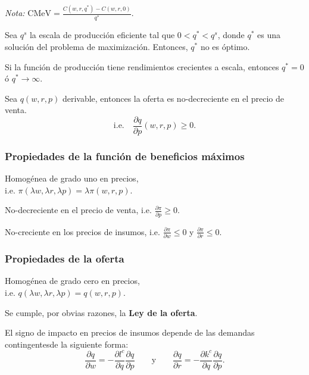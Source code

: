 \documentclass[8pt,a4paper]{extarticle}
\begin{document}
\begin{multicols}{3}
\textit{Nota:} $\displaystyle \text{CMeV} = \frac{C(w, r, q^*) - C(w, r, 0)}{q^*}$.

\sectionbreak

\begin{boxprop}
	Sea $q^s$ la escala de producción eficiente tal que $0 < q^* < q^s$, donde $q^*$ es una solución del problema de maximización. Entonces, $q^*$ no es óptimo.
\end{boxprop}

\begin{boxprop}
	Si la función de producción tiene rendimientos crecientes a escala, entonces $q^* = 0$ ó $q^* \to \infty$.
\end{boxprop}

\begin{boxtheo}
	Sea $q(w, r, p)$ derivable, entonces la oferta es no-decreciente en el precio de venta.
	\[
		\text{i.e.}\quad \frac{\partial q}{\partial p} (w, r, p) \ge 0
	.\] 
\end{boxtheo}

\subsubsection{Propiedades de la función de beneficios máximos}

\begin{eqlist}
\item Homogénea de grado uno en precios, \\ i.e. $\pi (\lambda w, \lambda r, \lambda p) = \lambda \pi(w, r, p)$.
\item No-decreciente en el precio de venta, i.e. $\displaystyle \frac{\partial \pi}{\partial p} \ge 0$.
\item No-creciente en los precios de insumos, i.e. $\displaystyle \frac{\partial \pi}{\partial w} \le 0$ y $\displaystyle \frac{\partial \pi}{\partial r} \le 0$.
\end{eqlist}

\subsubsection{Propiedades de la oferta}

\begin{eqlist}
\item Homogénea de grado cero en precios, \\ i.e. $q(\lambda w, \lambda r, \lambda p) = q(w, r, p)$.
\item Se cumple, por obvias razones, la \textbf{Ley de la oferta}.
\item El signo de impacto en precios de insumos depende de las demandas contingentesde la siguiente forma:
	\[
		\frac{\partial q}{\partial w} = - \frac{\partial l^c}{\partial q} \frac{\partial q}{\partial p} \qquad \text{y} \qquad \frac{\partial q}{\partial r} = - \frac{\partial k^c}{\partial q} \frac{\partial q}{\partial p}
	.\] 
\end{eqlist}


\end{multicols}
\end{document}
